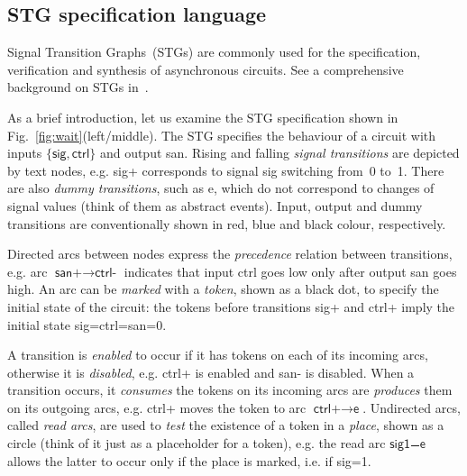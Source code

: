 \documentclass[conference]{IEEEtran}
\begin{document}

\subsection*{STG specification language}\label{sec-stg}

Signal Transition Graphs~(STGs) are commonly used for the specification,
verification and synthesis of asynchronous circuits. See a comprehensive
background on STGs in~\cite{2002_cortadella_book}.

As a brief introduction, let us examine the STG specification shown in
Fig.~\ref{fig:wait}(left/middle). The STG specifies the behaviour
of a circuit with inputs $\{\textsf{sig}, \textsf{ctrl}\}$
and output \textsf{san}. Rising and falling \emph{signal transitions} are depicted by text
nodes, e.g. \textsf{sig+} corresponds to signal \textsf{sig} switching from~0 to~1.
There are also \emph{dummy transitions}, such as \textsf{e}, which do not correspond to
changes of signal values (think of them as abstract events).
Input, output and dummy transitions are conventionally shown in red, blue and black
colour, respectively.

Directed arcs between nodes express the \emph{precedence} relation
between transitions, e.g. arc $\textsf{san+} \longrightarrow \textsf{ctrl-}$ indicates
that input \textsf{ctrl} goes low only after output \textsf{san} goes high.
An arc can be \emph{marked} with a \emph{token}, shown as a black dot, to specify
the initial state of the circuit: the tokens before transitions \textsf{sig+} and
\textsf{ctrl+} imply the initial state \textsf{sig=ctrl=san=0}.

A transition is \emph{enabled} to occur if it has tokens on each of its incoming
arcs, otherwise it is \emph{disabled}, e.g. \textsf{ctrl+} is enabled and \textsf{san-}
is disabled. When a transition occurs, it \emph{consumes} the tokens on its incoming arcs
are \emph{produces} them on its outgoing arcs, e.g. \textsf{ctrl+} moves the token to arc
$\textsf{ctrl+} \longrightarrow \textsf{e}$. Undirected arcs, called
\emph{read arcs}, are used to \emph{test} the existence of a token in a \emph{place}, shown as
a circle (think of it just as a placeholder for a token), e.g. the read arc
$\textsf{sig1} \frac{~~~~}{~} \textsf{e}$ allows the latter to occur only if the place
is marked, i.e. if \textsf{sig=1}.
\end{document}
